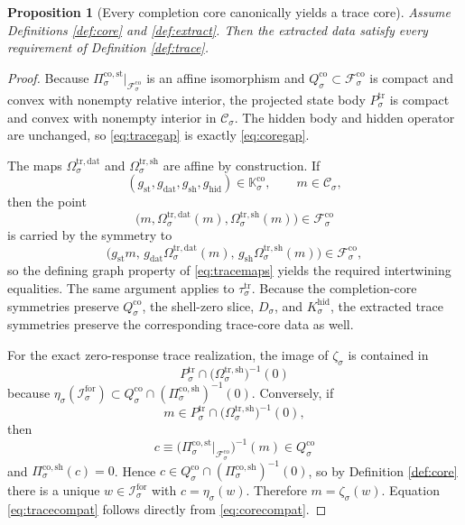 \documentclass[11pt]{article}
\newcommand{\ForSpace}[1]{\mathcal I_{#1}^{\mathrm{for}}}
\newcommand{\CoreState}[1]{\mathcal C_{#1}}
\newcommand{\CoreAffine}[1]{\mathcal F_{#1}^{\mathrm{co}}}
\newcommand{\CoreBody}[1]{Q_{#1}^{\mathrm{co}}}
\newcommand{\CoreStateProj}[1]{\Pi_{#1}^{\mathrm{co,st}}}
\newcommand{\CoreShellProj}[1]{\Pi_{#1}^{\mathrm{co,sh}}}
\newcommand{\CoreSym}[1]{\mathbb K_{#1}^{\mathrm{co}}}
\newcommand{\CoreEmbed}[1]{\eta_{#1}}
\newcommand{\GapBody}[1]{D_{#1}}
\newcommand{\HiddenOperator}[1]{K_{#1}^{\mathrm{hid}}}
\newcommand{\TraceBody}[1]{P_{#1}^{\mathrm{tr}}}
\newcommand{\TraceDataMap}[1]{\Omega_{#1}^{\mathrm{tr,dat}}}
\newcommand{\TraceShellMap}[1]{\Omega_{#1}^{\mathrm{tr,sh}}}
\newcommand{\TraceTime}[1]{\tau_{#1}^{\mathrm{tr}}}
\newcommand{\TraceEmbed}[1]{\zeta_{#1}}
\newtheorem{proposition}{Proposition}
\begin{document}
\begin{proposition}[Every completion core canonically yields a trace core]
\label{prop:trace}
Assume Definitions \ref{def:core} and \ref{def:extract}. Then the extracted data satisfy every requirement of Definition \ref{def:trace}.
\end{proposition}

\begin{proof}
Because \(\CoreStateProj{\sigma}\big|_{\CoreAffine{\sigma}}\) is an affine isomorphism and \(\CoreBody{\sigma}\subset\CoreAffine{\sigma}\) is compact and convex with nonempty relative interior, the projected state body \(\TraceBody{\sigma}\) is compact and convex with nonempty interior in \(\CoreState{\sigma}\). The hidden body and hidden operator are unchanged, so \eqref{eq:tracegap} is exactly \eqref{eq:coregap}.

The maps \(\TraceDataMap{\sigma}\) and \(\TraceShellMap{\sigma}\) are affine by construction. If
\[
(g_{\mathrm{st}},g_{\mathrm{dat}},g_{\mathrm{sh}},g_{\mathrm{hid}})
\in\CoreSym{\sigma},
\qquad
m\in\CoreState{\sigma},
\]
then the point
\[
\bigl(
m,\TraceDataMap{\sigma}(m),\TraceShellMap{\sigma}(m)
\bigr)
\in\CoreAffine{\sigma}
\]
is carried by the symmetry to
\[
\bigl(
g_{\mathrm{st}}m,\,
g_{\mathrm{dat}}\TraceDataMap{\sigma}(m),\,
g_{\mathrm{sh}}\TraceShellMap{\sigma}(m)
\bigr)\in\CoreAffine{\sigma},
\]
so the defining graph property of \eqref{eq:tracemaps} yields the required intertwining equalities. The same argument applies to \(\TraceTime{\sigma}\). Because the completion-core symmetries preserve \(\CoreBody{\sigma}\), the shell-zero slice, \(\GapBody{\sigma}\), and \(\HiddenOperator{\sigma}\), the extracted trace symmetries preserve the corresponding trace-core data as well.

For the exact zero-response trace realization, the image of \(\TraceEmbed{\sigma}\) is contained in
\[
\TraceBody{\sigma}\cap
\bigl(\TraceShellMap{\sigma}\bigr)^{-1}(0)
\]
because \(\CoreEmbed{\sigma}(\ForSpace{\sigma})\subset\CoreBody{\sigma}\cap(\CoreShellProj{\sigma})^{-1}(0)\). Conversely, if
\[
m\in\TraceBody{\sigma}\cap
\bigl(\TraceShellMap{\sigma}\bigr)^{-1}(0),
\]
then
\[
c\equiv
\bigl(
\CoreStateProj{\sigma}\big|_{\CoreAffine{\sigma}}
\bigr)^{-1}(m)
\in\CoreBody{\sigma}
\]
and \(\CoreShellProj{\sigma}(c)=0\). Hence \(c\in\CoreBody{\sigma}\cap(\CoreShellProj{\sigma})^{-1}(0)\), so by Definition \ref{def:core} there is a unique \(w\in\ForSpace{\sigma}\) with \(c=\CoreEmbed{\sigma}(w)\). Therefore \(m=\TraceEmbed{\sigma}(w)\). Equation \eqref{eq:tracecompat} follows directly from \eqref{eq:corecompat}.


\end{proof}
\end{document}
